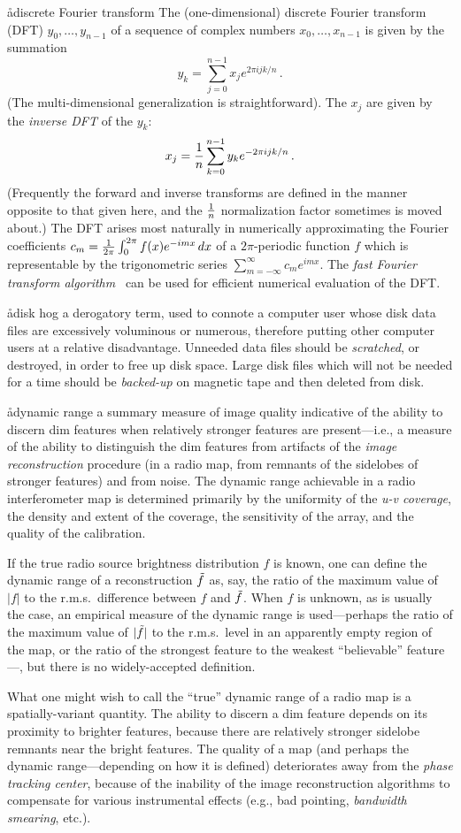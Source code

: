 \aa{discrete Fourier transform}
The (one-dimensional) discrete Fourier transform (DFT) $y_0,\dots,y_{n-1}$
of a sequence of complex numbers $x_0,\dots,x_{n-1}$
is given by the summation
$$y_k=\sum_{j=0}^{n-1}x_j e^{2\pi ijk/n}\,.$$
(The multi-dimensional generalization is straightforward).
The $x_j$ are given by the {\it inverse DFT} of the $y_k$:
$$x_j={1\over n}\sum_{k=0}^{n-1}y_k e^{-2\pi ijk/n}\,.$$
(Frequently the forward and inverse transforms are defined in the manner
opposite to that given here, and the $1\over n$ normalization factor
sometimes is moved about.)
The DFT arises most naturally in numerically approximating the Fourier
coefficients $c_m={1\over2\pi}\int_0^{2\pi}f(x)e^{-imx}\,dx$
of a $2\pi$-periodic function $f$ which is representable
by the trigonometric series $\sum_{m=-\infty}^\infty c_me^{imx}$.
The {\it fast Fourier transform algorithm} \qv\ can be used for efficient
numerical evaluation of the DFT.

\aa{disk hog}
a derogatory term, used to connote a computer user whose disk data files
are excessively voluminous or numerous, therefore putting
other computer users at a relative disadvantage.
Unneeded data files should be {\it scratched}, or destroyed,
in order to free up disk space.
Large disk files which will not be needed for a time
should be {\it backed-up} on magnetic tape and then deleted
from disk.

\aa{dynamic range}
a summary measure of image quality indicative
of the ability to discern dim features when relatively stronger
features are present---i.e., a measure of the ability to distinguish
the dim features
from artifacts of the {\it image reconstruction} procedure
(in a radio map, from remnants of the sidelobes of stronger features)
and from noise.
The dynamic range achievable in a radio interferometer map is determined
primarily by the uniformity of the {\it u-v coverage},
the density and extent of the coverage, the sensitivity of the array,
and the quality of the calibration.
\par
If the true radio source brightness distribution $f$ is known,
one can define the dynamic range of a reconstruction $\tilde f$
as, say, the ratio of the maximum value of $|f|$ to the r.m.s.\
difference between $f$ and $\tilde f$.
When $f$ is unknown, as is usually the case, an empirical measure
of the dynamic range is used---perhaps the ratio of the maximum
value of $|\tilde f|$ to the r.m.s.\ level in an apparently empty
region of the map, or the ratio of the strongest feature to the
weakest ``believable'' feature---,
but there is no widely-accepted definition.
\par
What one might wish to call the ``true'' dynamic range of a radio map
is a spatially-variant quantity.
The ability to discern a dim feature depends on
its proximity to brighter features, because there are relatively
stronger sidelobe remnants near the bright features.
The quality of a map
(and perhaps the dynamic range---depending on how it is defined)
deteriorates away from the {\it phase tracking center},
because of the inability of the
image reconstruction algorithms to compensate for various instrumental
effects (e.g., bad pointing, {\it bandwidth smearing}, etc.).

